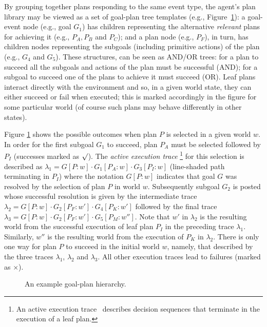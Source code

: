 By grouping together plans responding to the same event type, the agent's plan library may be viewed as a set of goal-plan tree templates (e.g., Figure~\ref{fig:confidence}): a goal-event node (e.g., goal $G_1$) has children representing the alternative \emph{relevant} plans for achieving it (e.g., $P_A,P_B$ and $P_C$); and a plan node (e.g., $P_F$), in turn, has children nodes representing the subgoals (including primitive actions) of the plan (e.g., $G_4$ and $G_5$). These structures, can be seen as AND/OR trees: for a plan to succeed all the subgoals and actions of the plan must be successful (AND); for a subgoal to succeed one of the plans to achieve it must succeed (OR). Leaf plans interact directly with the environment and so, in a given world state, they can either succeed or fail when executed; this is marked accordingly in the figure for some particular world (of course such plans may behave differently in other states).


Figure \ref{fig:confidence} shows the possible outcomes when plan $P$ is selected in a given world $w$. In order for the first subgoal $G_1$ to succeed, plan $P_A$ must be selected followed by $P_I$ (successes marked as $\surd$). The {\em active execution trace}%
\footnote{An active execution trace~\cite{singh10:learning} describes decision sequences that terminate in the execution of a leaf plan.} 
for this selection is described as $\lambda_1=G[P:w] \cdot G_1[P_A:w] \cdot G_3[P_I:w]$ (line-shaded path terminating in $P_I$) where the notation $G[P:w]$ indicates that goal $G$ was resolved by the selection of plan $P$ in world $w$. Subsequently subgoal $G_2$ is posted whose successful resolution is given by the intermediate trace $\lambda_2=G[P:w] \cdot G_2[P_F:w'] \cdot G_4[P_K:w']$ followed by the final trace $\lambda_3=G[P:w] \cdot G_2[P_F:w'] \cdot G_5[P_M:w'']$. Note that $w'$ in $\lambda_2$ is the resulting world from the successful execution of leaf plan $P_I$ in the preceding trace $\lambda_1$. 
Similarly, $w''$ is the resulting world from the execution of $P_K$ in $\lambda_2$. There is only one way for plan $P$ to succeed in the initial world $w$, namely, that described by the three traces $\lambda_1$, $\lambda_2$ and $\lambda_3$. All other execution traces lead to failures (marked as $\times$).

\begin{figure}[t]
\begin{center}
\resizebox{0.75\columnwidth}{!}{

}
\end{center}
\vskip -0.5cm
\caption{An example goal-plan hierarchy.}
\label{fig:confidence}
\vskip -0.3cm
\end{figure}


